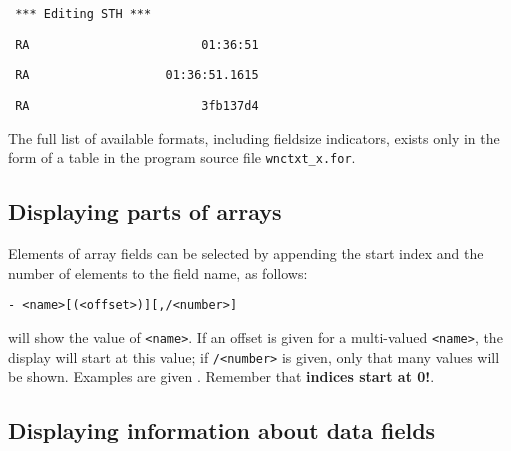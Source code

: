 \spbegin %
\svbegin \begin{verbatim} 
 *** Editing STH *** 
\end{verbatim}\svend 
%
%
\svbegin \begin{verbatim} 
 RA                        01:36:51
\end{verbatim} 
\svend 
\spend %
%
\spbegin %
%
\svbegin \begin{verbatim} 
 RA                   01:36:51.1615
\end{verbatim} 
\svend 
\spend %
%
\spbegin %
%
\svbegin \begin{verbatim} 
 RA                        3fb137d4 
\end{verbatim} 
\svend 
\spend %
%

	The full list of available formats, including fieldsize indicators,
exists only in the form of a table in the program source file
\verb/wnctxt_x.for/. 


\subsection{ Displaying parts of arrays} 

	Elements of array fields can be selected by appending the start index
and the number of elements to the field name, as follows: 

	\verb:- <name>[(<offset>)][,/<number>]: 

\noindent will show the value of \verb/<name>/.  If an offset is given for a
multi-valued \verb/<name>/, the display will start at this value; if
\verb:/<number>: is given, only that many values will be shown. 
Examples are given .  Remember that {\bf indices start at
0!}. 


\subsection{ Displaying information about data fields} 
\label{.show.meta} 

